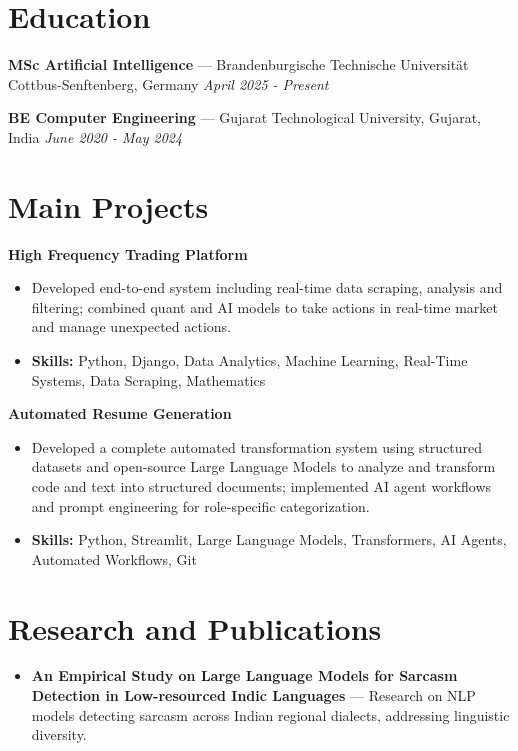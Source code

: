 \documentclass[a4paper,10pt]{article}
\begin{document}
\section*{Education}
\textbf{MSc Artificial Intelligence} — Brandenburgische Technische Universität Cottbus-Senftenberg, Germany \hfill \textit{April 2025 - Present}\par
\vspace{1.5pt}
\textbf{BE Computer Engineering} — Gujarat Technological University, Gujarat, India \hfill \textit{June 2020 - May 2024}\par

\section*{Main Projects}
\textbf{High Frequency Trading Platform}\par
\vspace{1pt}
\begin{itemize}
  \item Developed end-to-end system including real-time data scraping, analysis and filtering; combined quant and AI models to take actions in real-time market and manage unexpected actions.
  \item \textbf{Skills:} Python, Django, Data Analytics, Machine Learning, Real-Time Systems, Data Scraping, Mathematics
\end{itemize}
\vspace{3pt}
\textbf{Automated Resume Generation}\par
\vspace{1pt}
\begin{itemize}
  \item Developed a complete automated transformation system using structured datasets and open-source Large Language Models to analyze and transform code and text into structured documents; implemented AI agent workflows and prompt engineering for role-specific categorization.
  \item \textbf{Skills:} Python, Streamlit, Large Language Models, Transformers, AI Agents, Automated Workflows, Git
\end{itemize}

\section*{Research and Publications}
\begin{itemize}
\item \textbf{An Empirical Study on Large Language Models for Sarcasm Detection in Low-resourced Indic Languages} — Research on NLP models detecting sarcasm across Indian regional dialects, addressing linguistic diversity.
\end{itemize}
\end{document}
